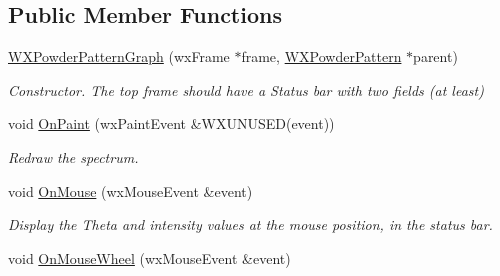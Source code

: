\subsection*{Public Member Functions}
\begin{DoxyCompactItemize}
\item 
\mbox{\label{class_obj_cryst_1_1_w_x_powder_pattern_graph_af3cafd773b977799e463c5e86267a9ac}} 
\mbox{\hyperlink{class_obj_cryst_1_1_w_x_powder_pattern_graph_af3cafd773b977799e463c5e86267a9ac}{W\+X\+Powder\+Pattern\+Graph}} (wx\+Frame $\ast$frame, \mbox{\hyperlink{class_obj_cryst_1_1_w_x_powder_pattern}{W\+X\+Powder\+Pattern}} $\ast$parent)
\begin{DoxyCompactList}\small\item\em Constructor. The top frame should have a Status bar with two fields (at least) \end{DoxyCompactList}\item 
\mbox{\label{class_obj_cryst_1_1_w_x_powder_pattern_graph_a7d0e648db65d7ce2657e23bbc699399b}} 
void \mbox{\hyperlink{class_obj_cryst_1_1_w_x_powder_pattern_graph_a7d0e648db65d7ce2657e23bbc699399b}{On\+Paint}} (wx\+Paint\+Event \&W\+X\+U\+N\+U\+S\+ED(event))
\begin{DoxyCompactList}\small\item\em Redraw the spectrum. \end{DoxyCompactList}\item 
\mbox{\label{class_obj_cryst_1_1_w_x_powder_pattern_graph_a5834ca4f7461f6094c61fa566bf2214e}} 
void \mbox{\hyperlink{class_obj_cryst_1_1_w_x_powder_pattern_graph_a5834ca4f7461f6094c61fa566bf2214e}{On\+Mouse}} (wx\+Mouse\+Event \&event)
\begin{DoxyCompactList}\small\item\em Display the Theta and intensity values at the mouse position, in the status bar. \end{DoxyCompactList}\item 
\mbox{\label{class_obj_cryst_1_1_w_x_powder_pattern_graph_af3da54e21ca379363feaf67facf3f55c}} 
void \mbox{\hyperlink{class_obj_cryst_1_1_w_x_powder_pattern_graph_af3da54e21ca379363feaf67facf3f55c}{On\+Mouse\+Wheel}} (wx\+Mouse\+Event \&event)

\end{DoxyCompactItemize}
